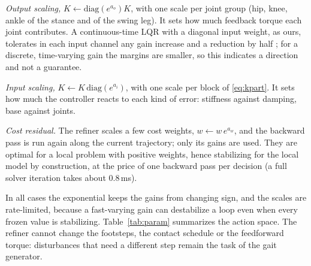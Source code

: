 \documentclass[conference]{IEEEtran}
\begin{document}
\emph{Output scaling,} $K\leftarrow\mathrm{diag}(e^{a_o})K$, with one scale per joint group (hip, knee, ankle of the stance and of the swing leg).
It sets how much feedback torque each joint contributes.
A continuous-time LQR with a diagonal input weight, as ours, tolerates in each input channel any gain increase and a reduction by half \cite{safonov1977margins}; for a discrete, time-varying gain the margins are smaller, so this indicates a direction and not a guarantee.

\emph{Input scaling,} $K\leftarrow K\,\mathrm{diag}(e^{a_i})$, with one scale per block of \eqref{eq:kpart}.
It sets how much the controller reacts to each kind of error: stiffness against damping, base against joints.

\emph{Cost residual.} The refiner scales a few cost weights, $w\leftarrow w\,e^{a_w}$, and the backward pass is run again along the current trajectory; only its gains are used.
They are optimal for a local problem with positive weights, hence stabilizing for the local model by construction, at the price of one backward pass per decision (a full solver iteration takes about 0.8\,ms).

In all cases the exponential keeps the gains from changing sign, and the scales are rate-limited, because a fast-varying gain can destabilize a loop even when every frozen value is stabilizing.
Table~\ref{tab:param} summarizes the action space.
The refiner cannot change the footsteps, the contact schedule or the feedforward torque: disturbances that need a different step remain the task of the gait generator.

\begin{table}[t]
\caption{Parametrizations of the refiner}
\label{tab:param}
\centering
\setlength{\tabcolsep}{3pt}
\end{table}
\end{document}
